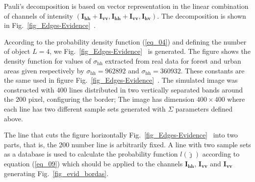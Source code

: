 \documentclass[conference]{IEEEtran}
\begin{document}
Pauli's decomposition is based on vector representation in the linear combination of channels of intensity $(\mathbf{I_\text{hh}+I_{\text{vv}}}, \mathbf{I_\text{hh}+I_{\text{vv}}}, \mathbf{I_\text{hv}})$. The decomposition is shown in Fig.~\ref{fig_Edges-Evidence}~. 

According to the probability density function (\ref{eq_04}) and defining the number of object $L=4$, we Fig.~\ref{fig_Edges-Evidence}~ is generated. The figure shows the density function for values of $\sigma_\text{hh}$ extracted from real data for forest and urban areas given respectively by $\sigma_\text{hh}=962892$ and $\sigma_\text{hh}= 360932$.  These constants are the same used in figure Fig.~\ref{fig_Edges-Evidence}~.
%
The simulated image was constructed with $400$ lines distributed in two vertically separated bands around the $200$ pixel, configuring the border; The image has dimension $400 \times 400$ where each line has two different sample sets generated with $\Sigma$ parameters defined above.  

The line that cuts the figure horizontally Fig.~\ref{fig_Edges-Evidence}~ into two parts, that is, the $200$ number line is arbitrarily fixed. A line with two sample sets as a database is used to calculate the probability function $l(\widehat\jmath)$ according to equation (\ref{eq_09}) which should be applied to the channels $\mathbf{I_\text{hh}}$, $\mathbf{I_\text{vv}}$ and $\mathbf{I_{\text{vv}}}$ generating Fig.~\ref{fig_evid_bordas}.  
    
\end{document}

